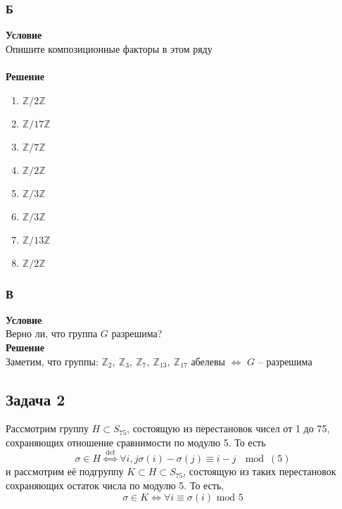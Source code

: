 			
			\subsubsection*{\textbf{Б}}
			\textbf{Условие}\\
			Опишите композиционные факторы в этом ряду\\
			\\
			\textbf{Решение}\\
			\begin{enumerate}
				\item $\mathbb{Z}\slash 2\mathbb{Z}$
				\item $\mathbb{Z}\slash 17\mathbb{Z}$
				\item $\mathbb{Z}\slash 7\mathbb{Z}$
				\item $\mathbb{Z}\slash 2\mathbb{Z}$
				\item $\mathbb{Z}\slash 3\mathbb{Z}$
				\item $\mathbb{Z}\slash 3\mathbb{Z}$
				\item $\mathbb{Z}\slash 13\mathbb{Z}$
				\item $\mathbb{Z}\slash 2\mathbb{Z}$
			\end{enumerate}
			
			
			\subsubsection*{\textbf{В}}
			\textbf{Условие}\\
			Верно ли, что группа $G$ разрешима?
			\\
			\textbf{Решение}\\
			Заметим, что группы: $\mathbb{Z}_{2},\ \mathbb{Z}_{3},\ \mathbb{Z}_{7},\ \mathbb{Z}_{13},\ \mathbb{Z}_{17}$  абелевы $\Leftrightarrow$ $G$ -- разрешима
			
		\subsection*{\textbf{Задача 2}}
			Рассмотрим группу $H \subset S_{75}$, состоящую из перестановок чисел от 1 до 75, сохраняющих отношение сравнимости по модулю 5. То есть
			\begin{equation*}
				\sigma \in H \stackrel{\text { def }}{\Leftrightarrow} \forall i, j \sigma(i)-\sigma(j) \equiv i-j\ \mod(5)
			\end{equation*}
			и рассмотрим её подгруппу $K \subset H \subset S_{75}$, состоящую из таких перестановок сохраняющих остаток числа по модулю 5. То есть,
			\begin{equation*}
				\sigma \in K \Leftrightarrow \forall i \equiv \sigma(i) \text { mod } 5
			\end{equation*}
			\\
